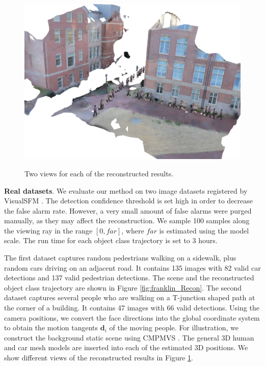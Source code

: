 \begin{figure}
{    \includegraphics[height=0.21\textheight]{chapter4/resource/tjunction2.PNG}
}
\caption[Example reconstruction results on two real datasets.]{Two views for each of the reconstructed results.}
\label{fig:reconstructed}
\end{figure}
\textbf{Real datasets}. We evaluate our method on two image datasets  registered by VisualSFM \cite{WuVSFM}. The detection confidence threshold  is set high in order to decrease the false alarm rate. However, a very small amount of false alarms were purged manually, as they may affect the reconstruction.  We sample 100 samples along the viewing ray in the range $[0,far]$, where $far$ is  estimated using the model scale. The run time for each object class trajectory is set to 3 hours.

The first dataset captures random pedestrians walking on a sidewalk, plus random cars driving on an adjacent road. It contains 135 images with 82 valid car detections and 137 valid pedestrian detections. The scene and the reconstructed object class trajectory are shown in Figure \ref{fig:franklin_Recon}. %
The second dataset captures several people who are walking on a T-junction shaped path at the corner of a building. It contains 47 images with 66 valid detections. Using the camera positions, we convert the face directions into the global coordinate system to obtain the motion tangents $\mathbf d_i$ of the moving people. For illustration, we construct the background static scene using CMPMVS \cite{JAN}. The general 3D human and car mesh models are inserted into each of the estimated 3D positions. We show different views of the reconstructed results in Figure \ref{fig:reconstructed}.

